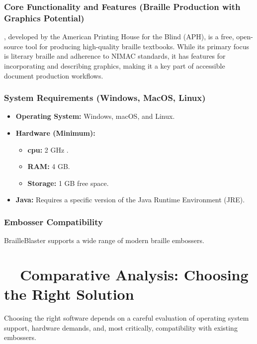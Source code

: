 \subsubsection{Core Functionality and Features (Braille Production with Graphics Potential)}\label{ch14:sssec:brailleblaster-features}
, developed by the American Printing House for the Blind (APH)\supercite{aph-brailleblaster, BrailleBlasterGitHub, brailleblaster-product}, is a free, open-source tool for producing high-quality braille textbooks. While its primary focus is literary braille and adherence to NIMAC standards, it has features for incorporating and describing graphics, making it a key part of accessible document production workflows.

\subsubsection{System Requirements (Windows, MacOS, Linux)}\label{ch14:sssec:brailleblaster-sysreq}
\begin{itemize}
	\item \textbf{Operating System:} Windows, macOS, and Linux.
	\item \textbf{Hardware (Minimum):}
	      \begin{itemize}
		      \item \textbf{\gls{cpu}:} 2 GHz .
		      \item \textbf{RAM:} 4 GB.
		      \item \textbf{Storage:} 1 GB free space.
	      \end{itemize}
	\item \textbf{Java:} Requires a specific version of the Java Runtime Environment (JRE).
\end{itemize}

\subsubsection{Embosser Compatibility}\label{ch14:sssec:brailleblaster-compat}
BrailleBlaster supports a wide range of modern braille embossers\supercite{APHBrailleBlasterFeatures}.

\section{~~Comparative Analysis: Choosing the Right Solution}\label{ch14:sec:comparative-analysis}
Choosing the right  software depends on a careful evaluation of operating system support, hardware demands, and, most critically, compatibility with existing embossers.

